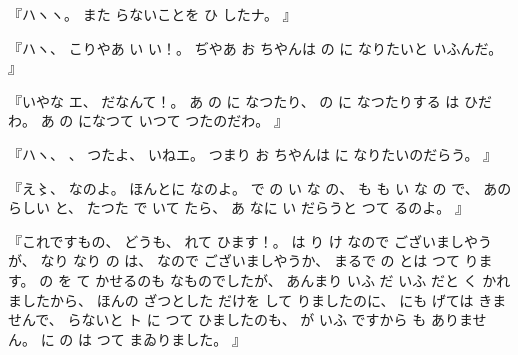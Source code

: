 %
『ハヽヽ。
%
また
らないことを
ひ
したナ。
』

%
『ハヽ、
%
こりやあ
い
い！。
%
ぢやあ
お
ちやんは
の
に
なりたいと
いふんだ。
』

%
『いやな
エ、
%
だなんて！。
%
あ
の
に
なつたり、
%
の
に
なつたりする
は
ひだわ。
%
あ
の
になつて
いつて
つたのだわ。
』

%
『ハヽ、
%
、
%
つたよ、
%
いねエ。
%
つまり
お
ちやんは
に
なりたいのだらう。
』

%
『え〻、%
%
なのよ。
%
ほんとに
なのよ。
%
で
の
い
な
の、
%
も
も
い
な
の
で、
%
あの
らしい
と、
%
たつた
で
いて
たら、
%
あ
なに
い
だらうと
つて
るのよ。
』

%
『これですもの、
%
どうも、
%
れて
ひます！。
%
は
り
け
なので
ございましやうが、
%
なり
なり
の
は、
%
なので
ございましやうか、
%
まるで
の
とは
つて
ります。
%
の
を
て
かせるのも
なものでしたが、
%
あんまり
いふ
だ
いふ
だと
く
かれましたから、
%
ほんの
ざつとした
だけを
して
りましたのに、
%
にも
げては
きませんで、
%
らないと
ト
に
つて
ひましたのも、
%
が
いふ
ですから
も
ありません。
%
に
の
は
つて
まゐりました。
』

